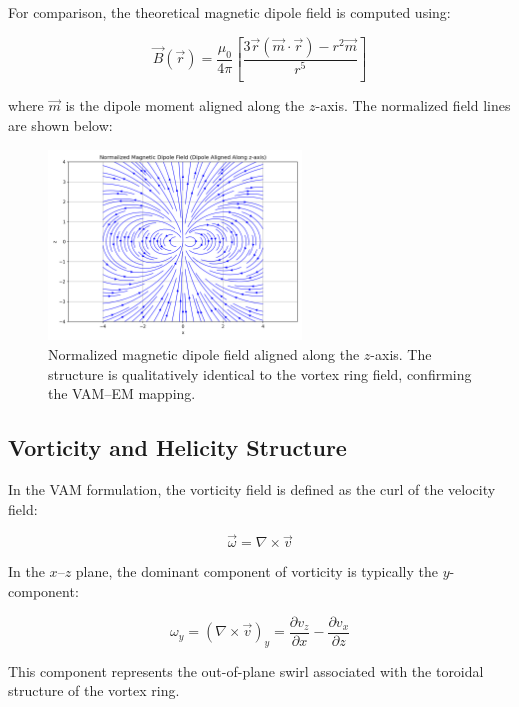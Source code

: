 For comparison, the theoretical magnetic dipole field is computed using:

\begin{equation}
\vec{B}(\vec{r}) = \frac{\mu_0}{4\pi} \left[ \frac{3\vec{r}(\vec{m} \cdot \vec{r}) - r^2 \vec{m}}{r^5} \right]
\end{equation}

\noindent
where $\vec{m}$ is the dipole moment aligned along the $z$-axis. The normalized field lines are shown below:

\begin{figure}[H]
    \centering
    \includegraphics[width=0.6\textwidth]{images/dipole_2}
    \caption{Normalized magnetic dipole field aligned along the $z$-axis. The structure is qualitatively identical to the vortex ring field, confirming the VAM–EM mapping.}
\end{figure}

\subsection{Vorticity and Helicity Structure}

In the VAM formulation, the vorticity field is defined as the curl of the velocity field:

\begin{equation}
\vec{\omega} = \nabla \times \vec{v}
\end{equation}

In the $x$–$z$ plane, the dominant component of vorticity is typically the $y$-component:

\begin{equation}
\omega_y = (\nabla \times \vec{v})_y = \frac{\partial v_z}{\partial x} - \frac{\partial v_x}{\partial z}
\end{equation}

This component represents the out-of-plane swirl associated with the toroidal structure of the vortex ring.

